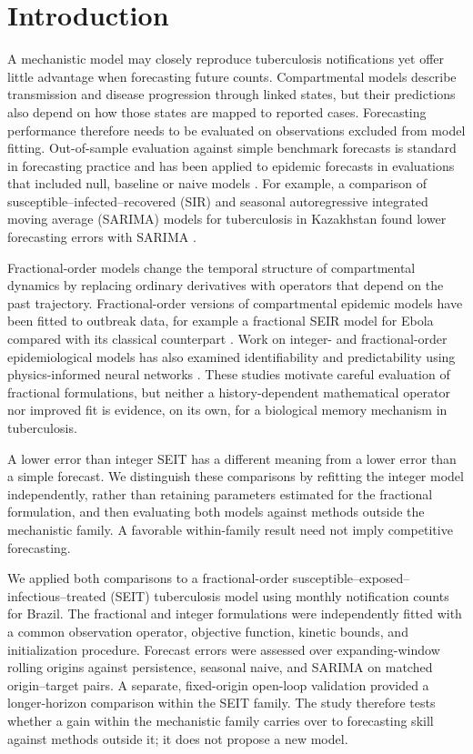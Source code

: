 \documentclass[pdflatex,sn-mathphys-ay,lineno]{sn-jnl}
\begin{document}
\section{Introduction}
A mechanistic model may closely reproduce tuberculosis notifications yet offer little advantage when forecasting future counts. Compartmental models describe transmission and disease progression through linked states, but their predictions also depend on how those states are mapped to reported cases. Forecasting performance therefore needs to be evaluated on observations excluded from model fitting. Out-of-sample evaluation against simple benchmark forecasts is standard in forecasting practice \citep{tashman2000,hyndman2006,petropoulos2022} and has been applied to epidemic forecasts in evaluations that included null, baseline or naive models \citep{funk2019,reich2019,cramer2022}. For example, a comparison of susceptible--infected--recovered (SIR) and seasonal autoregressive integrated moving average (SARIMA) models for tuberculosis in Kazakhstan found lower forecasting errors with SARIMA \citep{kalizhanova2024}.

Fractional-order models change the temporal structure of compartmental dynamics by replacing ordinary derivatives with operators that depend on the past trajectory. Fractional-order versions of compartmental epidemic models have been fitted to outbreak data, for example a fractional SEIR model for Ebola compared with its classical counterpart \citep{area2015}. Work on integer- and fractional-order epidemiological models has also examined identifiability and predictability using physics-informed neural networks \citep{kharazmi2021}. These studies motivate careful evaluation of fractional formulations, but neither a history-dependent mathematical operator nor improved fit is evidence, on its own, for a biological memory mechanism in tuberculosis.

A lower error than integer SEIT has a different meaning from a lower error than a simple forecast. We distinguish these comparisons by refitting the integer model independently, rather than retaining parameters estimated for the fractional formulation, and then evaluating both models against methods outside the mechanistic family. A favorable within-family result need not imply competitive forecasting.

We applied both comparisons to a fractional-order susceptible--exposed--infectious--treated (SEIT) tuberculosis model using monthly notification counts for Brazil. The fractional and integer formulations were independently fitted with a common observation operator, objective function, kinetic bounds, and initialization procedure. Forecast errors were assessed over expanding-window rolling origins against persistence, seasonal naive, and SARIMA on matched origin--target pairs. A separate, fixed-origin open-loop validation provided a longer-horizon comparison within the SEIT family. The study therefore tests whether a gain within the mechanistic family carries over to forecasting skill against methods outside it; it does not propose a new model.
\end{document}

